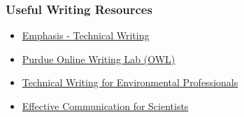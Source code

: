 \documentclass[
  letterpaper,
  DIV=11,
  numbers=noendperiod]{scrartcl}
\providecommand{\tightlist}{%
  \setlength{\itemsep}{0pt}\setlength{\parskip}{0pt}}\usepackage{longtable,booktabs,array}
\begin{document}
\subsubsection{Useful Writing Resources}\label{useful-writing-resources}

\begin{itemize}
\tightlist
\item
  \href{https://www.writing-skills.com/knowledge-hub/technical-writing/communicate-to-non-technical-audience}{Emphasis
  - Technical Writing}
\item
  \href{https://owl.purdue.edu/owl/subject_specific_writing/professional_technical_writing/index.html}{Purdue
  Online Writing Lab (OWL)}
\item
  \href{https://www.epa.gov/sites/default/files/2015-06/documents/technical-writing.pdf}{Technical
  Writing for Environmental Professionals}
\item
  \href{https://www.nature.com/scitable/ebooks/effective-communication-13953993/}{Effective
  Communication for Scientists}
\end{itemize}
\end{document}
